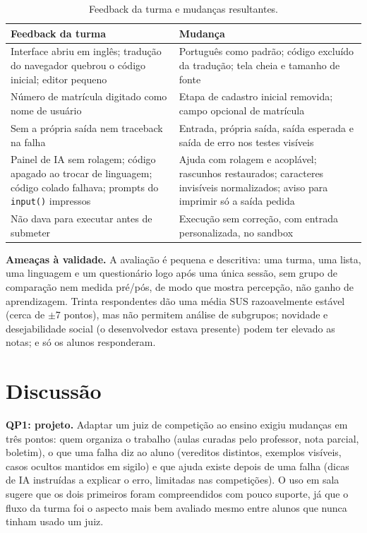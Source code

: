 \documentclass[12pt]{article}
\begin{document}
\begin{table}[ht]
\centering
\scriptsize
\caption{Feedback da turma e mudanças resultantes.}
\label{tab:feedback-fixes}
\begin{tabular}{>{\raggedright\arraybackslash}p{5.2cm}>{\raggedright\arraybackslash}p{8.8cm}}
\hline
\textbf{Feedback da turma} & \textbf{Mudança} \\
\hline
Interface abriu em inglês; tradução do navegador quebrou o código inicial; editor pequeno & Português como padrão; código excluído da tradução; tela cheia e tamanho de fonte \\
Número de matrícula digitado como nome de usuário & Etapa de cadastro inicial removida; campo opcional de matrícula \\
Sem a própria saída nem traceback na falha & Entrada, própria saída, saída esperada e saída de erro nos testes visíveis \\
Painel de IA sem rolagem; código apagado ao trocar de linguagem; código colado falhava; prompts do \texttt{input()} impressos & Ajuda com rolagem e acoplável; rascunhos restaurados; caracteres invisíveis normalizados; aviso para imprimir só a saída pedida \\
Não dava para executar antes de submeter & Execução sem correção, com entrada personalizada, no sandbox \\
\hline
\end{tabular}
\end{table}

\textbf{Ameaças à validade.} A avaliação é pequena e descritiva: uma turma, uma lista, uma linguagem e um questionário logo após uma única sessão, sem grupo de comparação nem medida pré/pós, de modo que mostra percepção, não ganho de aprendizagem. Trinta respondentes dão uma média SUS razoavelmente estável (cerca de $\pm$7 pontos), mas não permitem análise de subgrupos; novidade e desejabilidade social (o desenvolvedor estava presente) podem ter elevado as notas; e só os alunos responderam.

\section{Discussão}\label{sec:limitations}\label{sec:future-work}

\textbf{QP1: projeto.} Adaptar um juiz de competição ao ensino exigiu mudanças em três pontos: quem organiza o trabalho (aulas curadas pelo professor, nota parcial, boletim), o que uma falha diz ao aluno (vereditos distintos, exemplos visíveis, casos ocultos mantidos em sigilo) e que ajuda existe depois de uma falha (dicas de IA instruídas a explicar o erro, limitadas nas competições). O uso em sala sugere que os dois primeiros foram compreendidos com pouco suporte, já que o fluxo da turma foi o aspecto mais bem avaliado mesmo entre alunos que nunca tinham usado um juiz.
\end{document}
